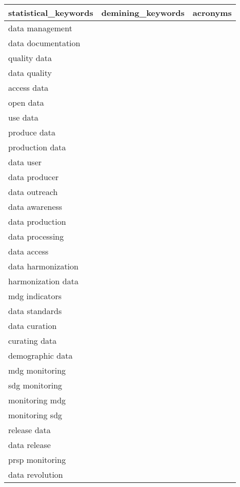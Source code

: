 \documentclass[
]{article}
\begin{document}
\begin{table}[H]
\centering\begingroup\fontsize{10}{12}\selectfont

\begin{tabular}{l|l|l}
\hline
statistical\_keywords & demining\_keywords & acronyms\\
\hline
data management &  & \\
\hline
data documentation &  & \\
\hline
quality data &  & \\
\hline
data quality &  & \\
\hline
access data &  & \\
\hline
open data &  & \\
\hline
use data &  & \\
\hline
produce data &  & \\
\hline
production data &  & \\
\hline
data user &  & \\
\hline
data producer &  & \\
\hline
data outreach &  & \\
\hline
data awareness &  & \\
\hline
data production &  & \\
\hline
data processing &  & \\
\hline
data access &  & \\
\hline
data harmonization &  & \\
\hline
harmonization data &  & \\
\hline
mdg indicators &  & \\
\hline
data standards &  & \\
\hline
data curation &  & \\
\hline
curating data &  & \\
\hline
demographic data &  & \\
\hline
mdg monitoring &  & \\
\hline
sdg monitoring &  & \\
\hline
monitoring mdg &  & \\
\hline
monitoring sdg &  & \\
\hline
release data &  & \\
\hline
data release &  & \\
\hline
prsp monitoring &  & \\
\hline
data revolution &  & \\
\hline
\end{tabular}
\endgroup{}
\end{table}
\end{document}
